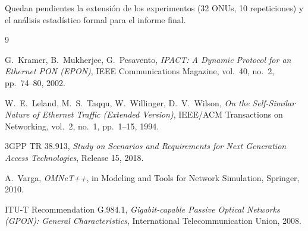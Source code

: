 \documentclass[12pt, letterpaper]{article}
\begin{document}
Quedan pendientes la extensión de los experimentos (32 ONUs, 10 repeticiones) y el análisis estadístico formal para el informe final.

\begin{thebibliography}{9}

G.\ Kramer, B.\ Mukherjee, G.\ Pesavento,
\textit{IPACT: A Dynamic Protocol for an Ethernet PON (EPON)},
IEEE Communications Magazine, vol.\ 40, no.\ 2, pp.\ 74--80, 2002.

W.\ E.\ Leland, M.\ S.\ Taqqu, W.\ Willinger, D.\ V.\ Wilson,
\textit{On the Self-Similar Nature of Ethernet Traffic (Extended Version)},
IEEE/ACM Transactions on Networking, vol.\ 2, no.\ 1, pp.\ 1--15, 1994.

3GPP TR 38.913,
\textit{Study on Scenarios and Requirements for Next Generation Access Technologies},
Release 15, 2018.

A.\ Varga,
\textit{OMNeT++},
in Modeling and Tools for Network Simulation, Springer, 2010.

ITU-T Recommendation G.984.1,
\textit{Gigabit-capable Passive Optical Networks (GPON): General Characteristics},
International Telecommunication Union, 2008.

\end{thebibliography}
\end{document}
